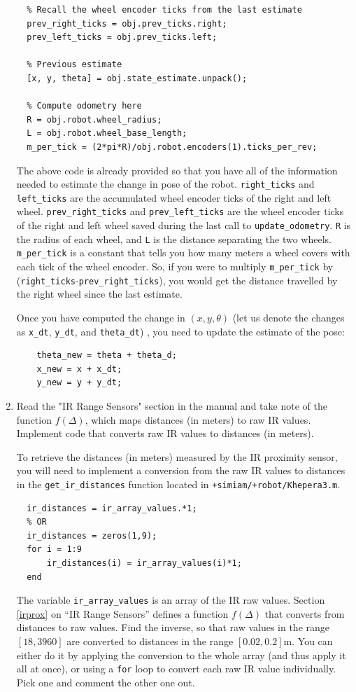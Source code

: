 \documentclass[10pt]{article}
\begin{document}
\begin{enumerate}
\begin{verbatim}
  % Recall the wheel encoder ticks from the last estimate
  prev_right_ticks = obj.prev_ticks.right;
  prev_left_ticks = obj.prev_ticks.left;

  % Previous estimate 
  [x, y, theta] = obj.state_estimate.unpack();

  % Compute odometry here
  R = obj.robot.wheel_radius;
  L = obj.robot.wheel_base_length;
  m_per_tick = (2*pi*R)/obj.robot.encoders(1).ticks_per_rev;\end{verbatim}
  The above code is already provided so that you have all of the information needed to estimate the change in pose of the robot. \texttt{right\_ticks} and \texttt{left\_ticks} are the accumulated wheel encoder ticks of the right and left wheel. \texttt{prev\_right\_ticks} and \texttt{prev\_left\_ticks} are the wheel encoder ticks of the right and left wheel saved during the last call to \texttt{update\_odometry}. \texttt{R} is the radius of each wheel, and \texttt{L} is the distance separating the two wheels. \texttt{m\_per\_tick} is a constant that tells you how many meters a wheel covers with each tick of the wheel encoder. So, if you were to multiply \texttt{m\_per\_tick} by (\texttt{right\_ticks}-\texttt{prev\_right\_ticks}), you would get the distance travelled by the right wheel since the last estimate.
  
  Once you have computed the change in $(x,y,\theta)$ (let us denote the changes as \texttt{x\_dt}, \texttt{y\_dt}, and \texttt{theta\_dt}) , you need to update the estimate of the pose:
  \begin{verbatim}
    theta_new = theta + theta_d;
    x_new = x + x_dt;
    y_new = y + y_dt;\end{verbatim}
 
 \item Read the "IR Range Sensors" section in the manual and take note of the function $f(\Delta)$, which maps distances (in meters) to raw IR values. Implement code that converts raw IR values to distances (in meters).
 
 To retrieve the distances (in meters) measured by the IR proximity sensor, you will need to implement a conversion from the raw IR values to distances in the \texttt{get\_ir\_distances} function located in \texttt{+simiam/+robot/Khepera3.m}.
 \begin{verbatim}
  ir_distances = ir_array_values.*1;
  % OR
  ir_distances = zeros(1,9);
  for i = 1:9
      ir_distances(i) = ir_array_values(i)*1;
  end\end{verbatim}
  The variable \texttt{ir\_array\_values} is an array of the IR raw values. Section \ref{irprox} on ``IR Range Sensors'' defines a function $f(\Delta)$ that converts from distances to raw values. Find the inverse, so that raw values in the range $[18,3960]$ are converted to distances in the range $[0.02,0.2]$m. You can either do it by applying the conversion to the whole array (and thus apply it all at once), or using a \texttt{for} loop to convert each raw IR value individually. Pick one and comment the other one out.
 
 
\end{enumerate}
\end{document}

